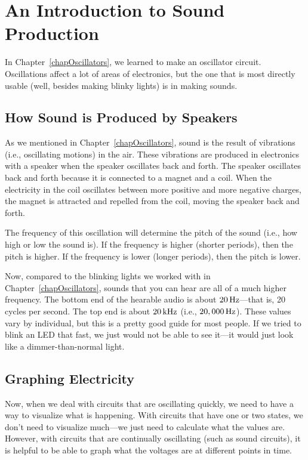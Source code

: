 \chapter{An Introduction to Sound Production}

In Chapter~\ref{chapOscillators}, we learned to make an oscillator circuit.
Oscillations affect a lot of areas of electronics, but the one that is most directly usable (well, besides making blinky lights) is in making sounds.

\section{How Sound is Produced by Speakers}

As we mentioned in Chapter~\ref{chapOscillators}, sound is the result of vibrations (i.e., oscillating motions) in the air.
These vibrations are produced in electronics with a speaker when the speaker oscillates back and forth.
The speaker oscillates back and forth because it is connected to a magnet and a coil.
When the electricity in the coil oscillates between more positive and more negative charges, the magnet is attracted and repelled from the coil, moving the speaker back and forth.

The frequency of this oscillation will determine the pitch of the sound (i.e., how high or low the sound is).
If the frequency is higher (shorter periods), then the pitch is higher.
If the frequency is lower (longer periods), then the pitch is lower.

Now, compared to the blinking lights we worked with in Chapter~\ref{chapOscillators}, sounds that you can hear are all of a much higher frequency.
The bottom end of the hearable audio is about $20\,\si{\hertz}$---that is, 20 cycles per second.
The top end is about $20\,\si{\kilo\hertz}$ (i.e., $20,000\,\si{\hertz}$).
These values vary by individual, but this is a pretty good guide for most people.
If we tried to blink an LED that fast, we just would not be able to see it---it would just look like a dimmer-than-normal light.

\section{Graphing Electricity}

Now, when we deal with circuits that are oscillating quickly, we need to have a way to visualize what is happening.
With circuits that have one or two states, we don't need to visualize much---we just need to calculate what the values are.
However, with circuits that are continually oscillating (such as sound circuits), it is helpful to be able to graph what the voltages are at different points in time.

